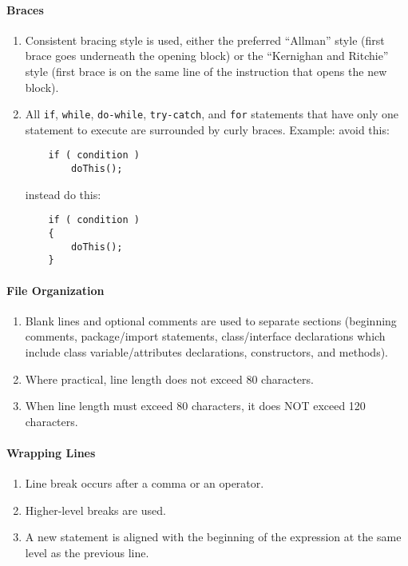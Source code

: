 \paragraph*{Braces}\begin{enumerate}[resume]
\item Consistent bracing style is used, either the preferred ``Allman'' style (first brace goes underneath the opening block) or the ``Kernighan and Ritchie'' style (first brace is on the same line of the instruction that opens the new block).
\item All \texttt{if}, \texttt{while}, \texttt{do-while}, \texttt{try-catch}, and \texttt{for} statements that have only one statement to execute are surrounded by curly braces. Example:
avoid this:


\begin{verbatim}
    if ( condition )
        doThis();
\end{verbatim}

instead do this:

\begin{verbatim}
    if ( condition ) 
    {
        doThis(); 
    }
\end{verbatim}

\end{enumerate}

\paragraph*{File Organization}\begin{enumerate}[resume]
\item Blank lines and optional comments are used to separate sections (beginning comments, package/import statements, class/interface declarations which include class variable/attributes declarations, constructors, and methods).
\item Where practical, line length does not exceed 80 characters.
\item When line length must exceed 80 characters, it does NOT exceed 120 characters.
\end{enumerate}

\paragraph*{Wrapping Lines}\begin{enumerate}[resume]
\item Line break occurs after a comma or an operator.
\item Higher-level breaks are used.
\item A new statement is aligned with the beginning of the expression at the same level as the previous line.
\end{enumerate}


